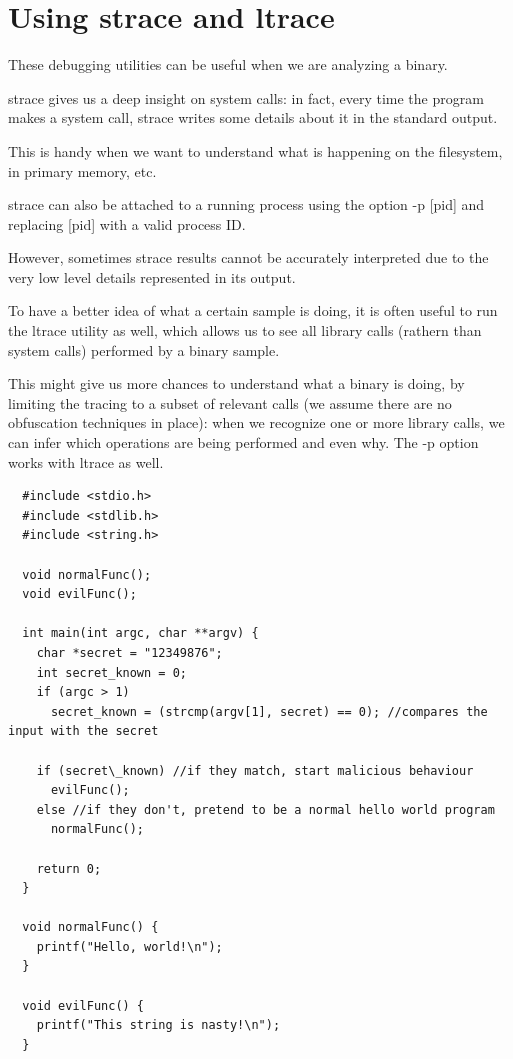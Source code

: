 \documentclass[]{project_plan}
\begin{document}
\section{Using strace and ltrace}

These debugging utilities can be useful when we are analyzing a binary.

strace gives us a deep insight on system calls: in fact, every time the program
makes a system call, strace writes some details about it in the standard output.

This is handy when we want to understand what is happening on the filesystem,
in primary memory, etc.

strace can also be attached to a running process using
the option -p [pid] and replacing [pid] with a valid process ID.

However, sometimes strace results cannot be accurately interpreted due to
the very low level details represented in its output.

To have a better idea of what
a certain sample is doing, it is often useful to run the ltrace utility as well,
which allows us to see all library calls (rathern than system calls) performed by
a binary sample.

This might give us more chances to understand what a binary
is doing, by limiting the tracing to a subset of relevant calls (we assume there
are no obfuscation techniques in place): when we recognize one or more library
calls, we can infer which operations are being performed and even why. The -p
option works with ltrace as well.

\begin{lstlisting}
  #include <stdio.h>
  #include <stdlib.h>
  #include <string.h>

  void normalFunc();
  void evilFunc();

  int main(int argc, char **argv) {
    char *secret = "12349876";
    int secret_known = 0;
    if (argc > 1)
      secret_known = (strcmp(argv[1], secret) == 0); //compares the input with the secret

    if (secret\_known) //if they match, start malicious behaviour
      evilFunc();
    else //if they don't, pretend to be a normal hello world program
      normalFunc();

    return 0;
  }

  void normalFunc() {
    printf("Hello, world!\n");
  }

  void evilFunc() {
    printf("This string is nasty!\n");
  }
\end{lstlisting}
\end{document}
